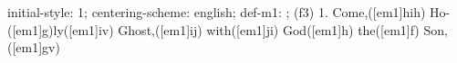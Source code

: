 initial-style: 1;
centering-scheme: english;
def-m1: \grealign;
(f3) 1. Come,([em1]hih) Ho-([em1]g)ly([em1]iv) Ghost,([em1]ij) with([em1]ji) God([em1]h) the([em1]f) Son,([em1]gv)